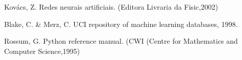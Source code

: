 

\begin{thebibliography}{99}
Kovács, Z. Redes neurais artificiais.  (Editora Livraria da Fisic,2002)

Blake, C. \& Merz, C. UCI repository of machine learning databases, 1998.

Rossum, G. Python reference manual.  (CWI (Centre for Mathematics and Computer Science,1995)

\end{thebibliography}
